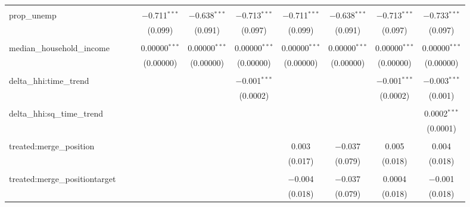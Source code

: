 \begin{table}[H]
{\begin{tabular}{@{\extracolsep{5pt}}lccccccccc}
   & & & & & & & & & \\  

  prop\_unemp &  &  & $-$0.711$^{***}$ & $-$0.638$^{***}$ & $-$0.713$^{***}$ & $-$0.711$^{***}$ & $-$0.638$^{***}$ & $-$0.713$^{***}$ & $-$0.733$^{***}$ \\  

   &  &  & (0.099) & (0.091) & (0.097) & (0.099) & (0.091) & (0.097) & (0.097) \\  

   & & & & & & & & & \\  

  median\_household\_income &  &  & 0.00000$^{***}$ & 0.00000$^{***}$ & 0.00000$^{***}$ & 0.00000$^{***}$ & 0.00000$^{***}$ & 0.00000$^{***}$ & 0.00000$^{***}$ \\  

   &  &  & (0.00000) & (0.00000) & (0.00000) & (0.00000) & (0.00000) & (0.00000) & (0.00000) \\  

   & & & & & & & & & \\  

  delta\_hhi:time\_trend &  &  &  &  & $-$0.001$^{***}$ &  &  & $-$0.001$^{***}$ & $-$0.003$^{***}$ \\  

   &  &  &  &  & (0.0002) &  &  & (0.0002) & (0.001) \\  

   & & & & & & & & & \\  

  delta\_hhi:sq\_time\_trend &  &  &  &  &  &  &  &  & 0.0002$^{***}$ \\  

   &  &  &  &  &  &  &  &  & (0.0001) \\  

   & & & & & & & & & \\  

  treated:merge\_position &  &  &  &  &  & 0.003 & $-$0.037 & 0.005 & 0.004 \\  

   &  &  &  &  &  & (0.017) & (0.079) & (0.018) & (0.018) \\  

   & & & & & & & & & \\  

  treated:merge\_positiontarget &  &  &  &  &  & $-$0.004 & $-$0.037 & 0.0004 & $-$0.001 \\  

   &  &  &  &  &  & (0.018) & (0.079) & (0.018) & (0.018) \\  


\end{tabular}}
\end{table}
